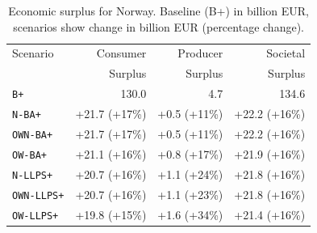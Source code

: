 \begin{table}[htbp]
\centering
\caption{Economic surplus for Norway. Baseline (B+) in billion EUR, scenarios show change in billion EUR (percentage change).}
\label{tab:surplus_norway}
\begin{tabular}{lrrr}
\toprule
Scenario & Consumer & Producer & Societal \\
 & Surplus & Surplus & Surplus \\
\midrule
\multicolumn{1}{l}{\texttt{B+}} & 130.0 & 4.7 & 134.6 \\
\midrule
\texttt{N-BA+} & +21.7 (+17\%) & +0.5 (+11\%) & +22.2 (+16\%) \\
\texttt{OWN-BA+} & +21.7 (+17\%) & +0.5 (+11\%) & +22.2 (+16\%) \\
\texttt{OW-BA+} & +21.1 (+16\%) & +0.8 (+17\%) & +21.9 (+16\%) \\
\midrule
\texttt{N-LLPS+} & +20.7 (+16\%) & +1.1 (+24\%) & +21.8 (+16\%) \\
\texttt{OWN-LLPS+} & +20.7 (+16\%) & +1.1 (+23\%) & +21.8 (+16\%) \\
\texttt{OW-LLPS+} & +19.8 (+15\%) & +1.6 (+34\%) & +21.4 (+16\%) \\
\bottomrule
\end{tabular}
\end{table}

